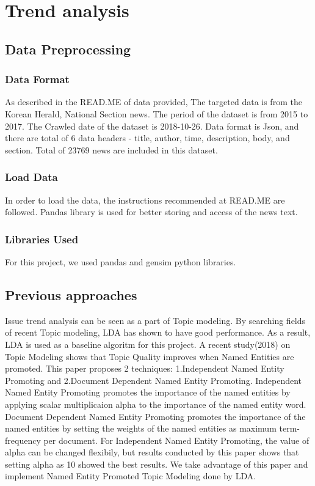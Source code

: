 \section{Trend analysis}
\usepackage{minted}

\subsection{Data Preprocessing}
\subsubsection{Data Format}
As described in the READ.ME of data provided, The targeted data is from the Korean Herald, National Section news. The period of the dataset is from 2015 to 2017. The Crawled date of the dataset is 2018-10-26. Data format is Json, and there are total of 6 data headers - title, author, time, description, body, and section. Total of 23769 news are included in this dataset.
\subsubsection{Load Data}
In order to load the data, the instructions recommended at READ.ME are followed. Pandas library is used for better storing and access of the news text.
\subsubsection{Libraries Used}
For this project, we used pandas and gensim python libraries.


\subsection{Previous approaches}
Issue trend analysis can be seen as a part of Topic modeling. By searching fields of recent Topic modeling, LDA has shown to have good performance. As a result, LDA is used as a baseline algoritm for this project.
A recent study(2018) on Topic Modeling shows that Topic Quality improves when Named Entities are promoted. This paper proposes 2 techniques: 1.Independent Named Entity Promoting and 2.Document Dependent Named Entity Promoting. Independent Named Entity Promoting promotes the importance of the named entities by applying scalar multiplicaion alpha to the importance of the named entity word. Document Dependent Named Entity Promoting promotes the importance of the named entities by setting the weights of the named entities as maximum term-frequency per document. For Independent Named Entity Promoting, the value of alpha can be changed flexibily, but results conducted by this paper shows that setting alpha as 10 showed the best results.
We take advantage of this paper and implement Named Entity Promoted Topic Modeling done by LDA.
